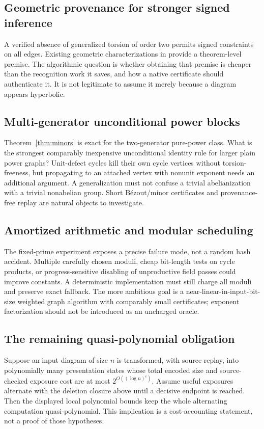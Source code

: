 \documentclass[11pt]{article}
\theoremstyle{definition}\newtheorem{definition}[theorem]{Definition}
\theoremstyle{remark}\newtheorem{remark}[theorem]{Remark}
\begin{document}
\subsection{Geometric provenance for stronger signed inference}
A verified absence of generalized torsion of order two permits signed
constraints on all edges. Existing geometric characterizations in
\cite{HMT} provide a theorem-level premise. The algorithmic question is
whether obtaining that premise is cheaper than the recognition work it
saves, and how a native certificate should authenticate it. It is not
legitimate to assume it merely because a diagram appears hyperbolic.

\subsection{Multi-generator unconditional power blocks}
Theorem~\ref{thm:minors} is exact for the two-generator pure-power class.
What is the strongest comparably inexpensive unconditional identity rule
for larger plain power graphs? Unit-defect cycles kill their own cycle
vertices without torsion-freeness, but propagating to an attached vertex
with nonunit exponent needs an additional argument. A generalization
must not confuse a trivial abelianization with a trivial nonabelian group.
Short B\'ezout/minor certificates and provenance-free replay are natural
objects to investigate.

\subsection{Amortized arithmetic and modular scheduling}
The fixed-prime experiment exposes a precise failure mode, not a random
hash accident. Multiple carefully chosen moduli, cheap bit-length tests
on cycle products, or progress-sensitive disabling of unproductive field
passes could improve constants. A deterministic implementation must still
charge all moduli and preserve exact fallback. The more ambitious goal
is a near-linear-in-input-bit-size weighted graph algorithm with comparably
small certificates; exponent factorization should not be introduced as
an uncharged oracle.

\subsection{The remaining quasi-polynomial obligation}
Suppose an input diagram of size $n$ is transformed, with source replay,
into polynomially many presentation states whose total encoded size and
source-checked exposure cost are at most $2^{O((\log n)^c)}$. Assume useful
exposures alternate with the deletion closure above until a decisive
endpoint is reached. Then the displayed local polynomial bounds keep the
whole alternating computation quasi-polynomial. This implication is a
cost-accounting statement, not a proof of those hypotheses.
\end{document}
